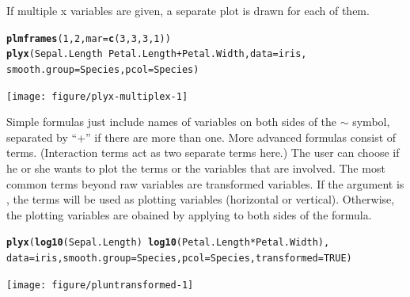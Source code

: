\documentclass[11pt]{article}\usepackage[]{graphicx}\usepackage[]{color}
\makeatletter
\newcommand{\hlnum}[1]{\textcolor[rgb]{0.686,0.059,0.569}{#1}}%
\newcommand{\hlopt}[1]{\textcolor[rgb]{0,0,0}{#1}}%
\newcommand{\hlstd}[1]{\textcolor[rgb]{0.345,0.345,0.345}{#1}}%
\newcommand{\hlkwc}[1]{\textcolor[rgb]{0.333,0.667,0.333}{#1}}%
\newcommand{\hlkwd}[1]{\textcolor[rgb]{0.737,0.353,0.396}{\textbf{#1}}}%
\newenvironment{kframe}{%
 \def\at@end@of@kframe{}%
 \ifinner\ifhmode%
  \def\at@end@of@kframe{\end{minipage}}%
  \begin{minipage}{\columnwidth}%
 \fi\fi%
 \def\FrameCommand##1{\hskip\@totalleftmargin \hskip-\fboxsep
 \colorbox{shadecolor}{##1}\hskip-\fboxsep
     \hskip-\linewidth \hskip-\@totalleftmargin \hskip\columnwidth}%
 \MakeFramed {\advance\hsize-\width
   \@totalleftmargin\z@ \linewidth\hsize
   \@setminipage}}%
 {\par\unskip\endMakeFramed%
 \at@end@of@kframe}
\newenvironment{knitrout}{}{} %
\makeatother
\begin{document}
If multiple x variables are given, a separate plot is drawn for each of them.
\begin{knitrout}
\color{fgcolor}\begin{kframe}
\begin{alltt}
\hlkwd{plmframes}\hlstd{(}\hlnum{1}\hlstd{,}\hlnum{2}\hlstd{,} \hlkwc{mar}\hlstd{=}\hlkwd{c}\hlstd{(}\hlnum{3}\hlstd{,}\hlnum{3}\hlstd{,}\hlnum{3}\hlstd{,}\hlnum{1}\hlstd{))}
\hlkwd{plyx}\hlstd{(Sepal.Length}\hlopt{~}\hlstd{Petal.Length}\hlopt{+}\hlstd{Petal.Width,} \hlkwc{data}\hlstd{=iris,}
     \hlkwc{smooth.group}\hlstd{=Species,} \hlkwc{pcol}\hlstd{=Species)}
\end{alltt}
\end{kframe}
\texttt{[image: figure/plyx-multiplex-1]} 

\end{knitrout}


Simple formulas just include names of variables on both sides of the $\sim$
symbol, separated by ``+'' if there are more than one. 
More advanced formulas consist of terms.
(Interaction terms act as two separate terms here.)
The user can choose if he or she wants to plot the terms or the variables
that are involved. 
The most common terms beyond raw variables are transformed variables.
If the argument  is , the terms will be used as
plotting variables (horizontal or vertical). 
Otherwise, the plotting variables are obained by applying  to
both sides of the formula.

\begin{knitrout}
\color{fgcolor}\begin{kframe}
\begin{alltt}
  \hlkwd{plyx}\hlstd{(}\hlkwd{log10}\hlstd{(Sepal.Length)} \hlopt{~} \hlkwd{log10}\hlstd{(Petal.Length}\hlopt{*}\hlstd{Petal.Width),}
       \hlkwc{data}\hlstd{=iris,} \hlkwc{smooth.group}\hlstd{=Species,} \hlkwc{pcol}\hlstd{=Species,} \hlkwc{transformed}\hlstd{=}\hlnum{TRUE}\hlstd{)}
\end{alltt}
\end{kframe}
\texttt{[image: figure/pluntransformed-1]} 

\end{knitrout}
\end{document}
